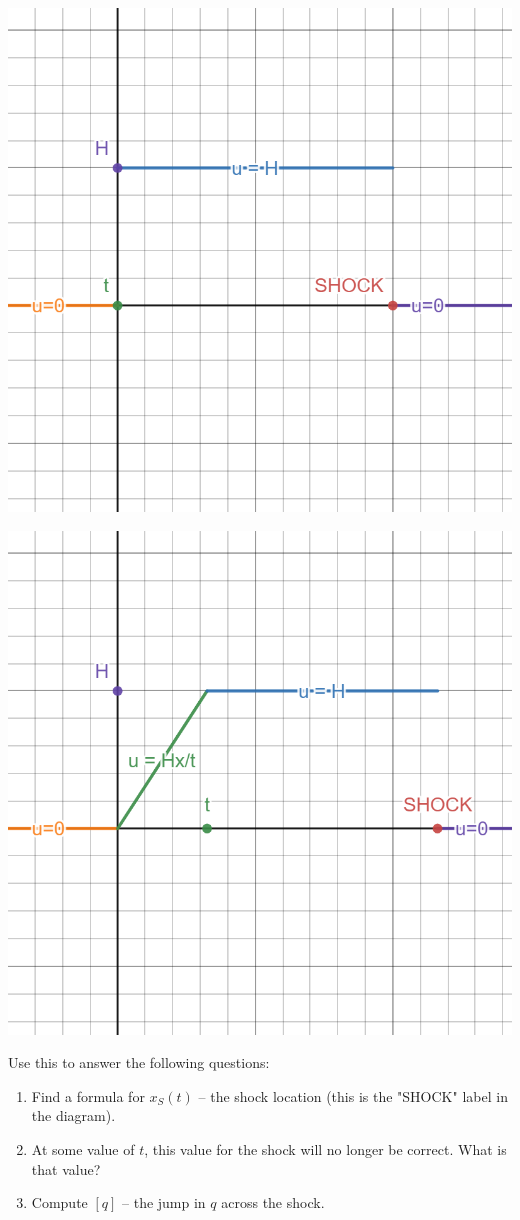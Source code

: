 \documentclass[12pt]{exam}
\begin{document}
\begin{questions}
\begin{question}
\begin{minipage}{.484\linewidth}
\includegraphics[width=.9\linewidth]{graph27.png}
\end{minipage}
\begin{minipage}{.484\linewidth}
\includegraphics[width=.9\linewidth]{graph26.png}
\end{minipage}

Use this to answer the following questions: 
\begin{enumerate}
    \item Find a formula for $x_S(t)$ -- the shock location (this is the "SHOCK" label in the diagram). 
    \item At some value of $t$, this value for the shock will no longer be correct. What is that value?
    \item Compute $[q]$ -- the jump in $q$ across the shock. 
\end{enumerate}



\end{question}
\end{questions}
\end{document}
